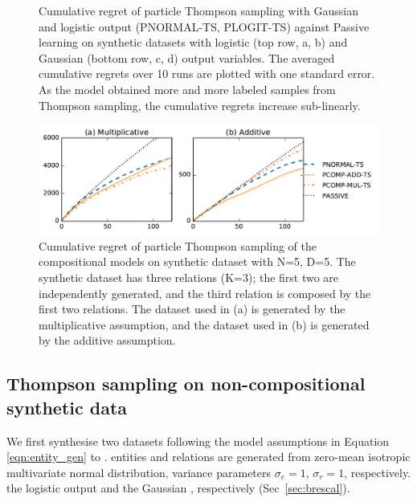 \begin{figure}[t]
{	}
	\caption{\label{fig:synthetic} Cumulative regret of particle Thompson sampling with Gaussian and logistic output (PNORMAL-TS, PLOGIT-TS) against Passive learning
	on synthetic datasets with logistic	(top row, a, b) and Gaussian (bottom row, c, d) output variables.
	The averaged cumulative regrets over 10 runs are plotted with one standard error.
	As the model obtained more and more labeled samples from Thompson sampling,
	the cumulative regrets increase sub-linearly.}
\end{figure}

\begin{figure}[t]
	\centering
	\includegraphics[width=\linewidth]{images/toy_comp_5_2_5.pdf}
	\caption{\label{fig:comp_synthetic} Cumulative regret of particle Thompson sampling of the compositional models on synthetic dataset with N=5, D=5. The synthetic dataset has three relations (K=3); the first two are independently generated, and the third relation is composed by the first two relations. The dataset used in (a) is generated by the multiplicative assumption, and the dataset used in (b) is generated by the additive assumption.}
\end{figure}

\subsection{Thompson sampling on non-compositional synthetic data}

We first synthesise two datasets
following the model assumptions in Equation \ref{eqn:entity_gen} to
\verify{\ref{eqn:triple_gen}}.
entities and relations are generated from zero-mean isotropic multivariate normal distribution, 
variance parameters $\sigma_e=1$, $\sigma_r=1$, respectively.
 the logistic output and the Gaussian , respectively (Sec~\ref{sec:brescal}).

